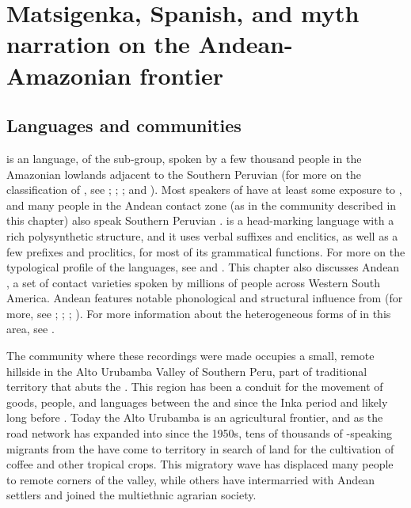 \documentclass[output=paper]{LSP/langsci}
\begin{document}
\section{ Matsigenka, Spanish, and myth narration on the Andean-Amazonian frontier}
\label{Emmayth.narration}
\subsection{Languages and communities}
\label{Emland.comm}
 is an  language, of the  sub-group, spoken by a few thousand people in the Amazonian lowlands adjacent to the Southern Peruvian  (for more on the classification of , see \citealt{aikhenvald1999}; \citealt[][212--219]{michael08}; \citealt{michael10}; and \citealt{payne81}). Most speakers of  have at least some exposure to , and many people in the Andean contact zone (as in the community described in this chapter) also speak Southern Peruvian  \citep{emlen.2017}.  is a head-marking language with a rich polysynthetic structure, and it uses verbal suffixes and enclitics, as well as a few prefixes and proclitics, for most of its grammatical functions. For more on the typological profile of the  languages, see \citet{michael08} and \citet{mihas15}. This chapter also discusses Andean , a set of contact varieties spoken by millions of people across Western South America. Andean  features notable phonological and structural influence from  (for more, see \citealt[][593--595]{adelaar2004}; \citealt{babel18}; \citealt{cerron03}; \citealt{escobar03}). For more information about the heterogeneous forms of  in this area, see \citet{emlenforth}.
 
The community where these recordings were made occupies a small, remote hillside in the  {Alto Urubamba} Valley of Southern Peru, part of traditional  territory that abuts the . This region has been a conduit for the movement of goods, people, and languages between the  and  since the Inka period and likely long before \citep{Gade1972,camino.1977}. Today the {Alto Urubamba} is an agricultural frontier, and as the road network has expanded into  since the 1950s, tens of thousands of -speaking migrants from the  have come to  territory in search of land for the cultivation of coffee and other tropical crops. This migratory wave has displaced many  people to remote corners of the valley, while others have intermarried with Andean settlers and joined the multiethnic agrarian society.
\end{document}
